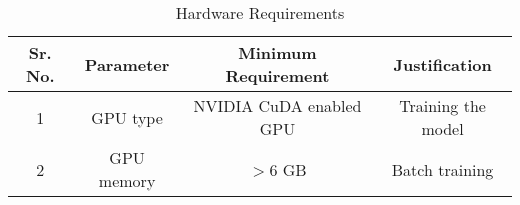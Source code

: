 \begin{table}[!htbp]
\begin{center}
\def\arraystretch{1.5}
  \begin{tabular}{| c | c | c | c |}
\hline
Sr. No. &	Parameter &	Minimum Requirement & Justification \\
\hline
1 &	GPU type &	 NVIDIA CuDA enabled GPU  & Training the model\\
\hline
2 &	GPU memory  &	$>$6 GB &  Batch training\\
 \hline
\end{tabular}
 \caption { Hardware Requirements }
 \label{tab:hreq}
\end{center}

\end{table}
